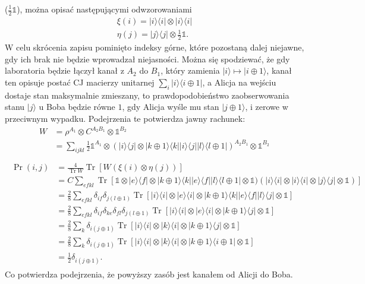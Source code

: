 \documentclass[10pt]{article} %
\DeclareMathOperator{\Trs}{Tr}
\newcommand{\Ket}[1]{|#1\rangle}
\newcommand{\Bra}[1]{\langle#1|}
\newcommand{\I}{\mathbb{1}}
\begin{document}
($\frac{1}{2}\I$), można opisać następującymi odwzorowaniami
\begin{gather}
\xi(i) = \Ket{i}\Bra{i} \otimes \Ket{i}\Bra{i} \\
\eta(j) = \Ket{j}\Bra{j} \otimes \frac{1}{2}\I.
\end{gather} 
W celu skrócenia zapisu pominięto indeksy górne, które pozostaną dalej niejawne, gdy ich brak nie będzie wprowadzał niejasności.
Można się spodziewać, że gdy laboratoria będzie łączył kanał z $A_2$ do $B_1$, który zamienia $\Ket{i} \mapsto \Ket{i \oplus 1}$, kanał ten opisuje postać CJ macierzy unitarnej $\sum_i \Ket{i}\Bra{i \oplus 1}$, a Alicja na wejściu dostaje stan maksymalnie zmieszany, to prawdopodobieństwo
zaobserwowania stanu $\Ket{j}$ u Boba będzie równe $1$, gdy Alicja wyśle mu stan $\Ket{j \oplus 1}$, i zerowe w przeciwnym wypadku. Podejrzenia te potwierdza jawny rachunek:
\begin{equation}
\begin{split}
W &= \rho^{A_1} \otimes C^{A_2B_1} \otimes \I^{B_2} \\&= \sum_{ijkl} \frac{1}{2}\I^{A_1} \otimes\left( \Ket{i}\Bra{j} \otimes \Ket{k\oplus 1}\Bra{k} \Ket{i}\Bra{j} \Ket{l}\Bra{l \oplus 1}\right)^{A_2B_1} \otimes \I^{B_2} \\
\end{split}
\end{equation}
\begin{gather}
\begin{split}
\Pr(i,j) &= \frac{4}{\Trs W} \Trs\left[ W (\xi(i) \otimes \eta(j))\right]\\&=C \sum_{efkl} \Trs [\I \otimes \Ket{e}\Bra{f} \otimes \Ket{k\oplus 1}\Bra{k} \Ket{e}\Bra{f} \Ket{l}\Bra{l \oplus 1} \otimes \I)(\Ket{i}\Bra{i} \otimes \Ket{i}\Bra{i} \otimes \Ket{j}\Bra{j} \otimes \I)] \\
&= \frac{2}{8} \sum_{efkl} \delta_{if} \delta_{j(l \oplus 1)} \Trs \left[ \Ket{i}\Bra{i} \otimes \Ket{e}\Bra{i} \otimes \Ket{k \oplus 1}\Bra{k}\Ket{e}\Bra{f}\Ket{l}\Bra{j} \otimes \I \right] \\
&= \frac{2}{8} \sum_{efkl} \delta_{if} \delta_{ke} \delta_{fl} \delta_{j(l \oplus 1)} \Trs \left[ \Ket{i}\Bra{i} \otimes \Ket{e}\Bra{i} \otimes \Ket{k \oplus 1} \Bra{j} \otimes \I\right] \\
&= \frac{2}{8} \sum_{k} \delta_{i(j \oplus 1)} \Trs \left[ \Ket{i}\Bra{i} \otimes \Ket{k}\Bra{i} \otimes \Ket{k \oplus 1}\Bra{j} \otimes \I \right]  \\
&= \frac{2}{8} \sum_k \delta_{i(j \oplus 1)} \Trs \left[ \Ket{i}\Bra{i} \otimes \Ket{k}\Bra{i} \otimes \Ket{k \oplus 1}\Bra{i \oplus 1} \otimes  \I\right] \\
&=  \frac{1}{2} \delta_{i(j \oplus 1)}.
\end{split} 
\end{gather}  Co potwierdza podejrzenia, że powyższy zasób jest kanałem od Alicji do Boba.
\end{document}

